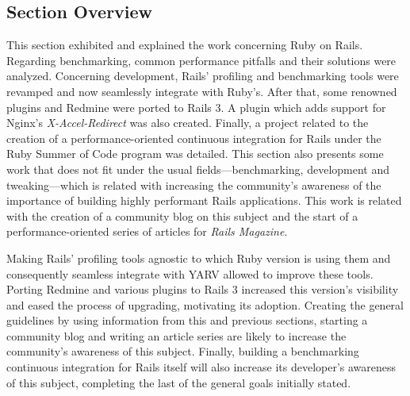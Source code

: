 \subsection{Section Overview}
This section exhibited and explained the work concerning Ruby on Rails. Regarding benchmarking, common performance pitfalls and their solutions were analyzed. Concerning development, Rails' profiling and benchmarking tools were revamped and now seamlessly integrate with Ruby's. After that, some renowned plugins and Redmine were ported to Rails 3. A plugin which adds support for Nginx's \textit{X-Accel-Redirect} was also created. Finally, a project related to the creation of a performance-oriented continuous integration for Rails under the Ruby Summer of Code program was detailed. This section also presents some work that does not fit under the usual fields---benchmarking, development and tweaking---which is related with increasing the community's awareness of the importance of building highly performant Rails applications. This work is related with the creation of a community blog on this subject and the start of a performance-oriented series of articles for \textit{Rails Magazine}.

Making Rails' profiling tools agnostic to which Ruby version is using them and consequently seamless integrate with YARV allowed to improve these tools. Porting Redmine and various plugins to Rails 3 increased this version's visibility and eased the process of upgrading, motivating its adoption. Creating the general guidelines by using information from this and previous sections, starting a community blog and writing an article series are likely to increase the community's awareness of this subject. Finally, building a benchmarking continuous integration for Rails itself will also increase its developer's awareness of this subject, completing the last of the general goals initially stated.
